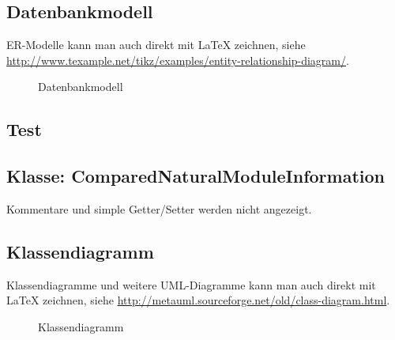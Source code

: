 

\subsection{Datenbankmodell}
\label{app:Datenbankmodell}
ER-Modelle kann man auch direkt mit \LaTeX{} zeichnen, siehe \zB \url{http://www.texample.net/tikz/examples/entity-relationship-diagram/}.
\begin{figure}[htb]
\centering
{}
\caption{Datenbankmodell}
\end{figure}
\clearpage




\subsection{Test}
\label{app:test}
\clearpage
{}
\clearpage

\subsection{Klasse: ComparedNaturalModuleInformation}
\label{app:CNMI}
Kommentare und simple Getter/Setter werden nicht angezeigt.

\clearpage

\subsection{Klassendiagramm}
\label{app:Klassendiagramm}
Klassendiagramme und weitere \acs{UML}-Diagramme kann man auch direkt mit \LaTeX{} zeichnen, siehe \zB \url{http://metauml.sourceforge.net/old/class-diagram.html}.
\begin{figure}[htb]
\centering
{}
\caption{Klassendiagramm}
\end{figure}
\clearpage


